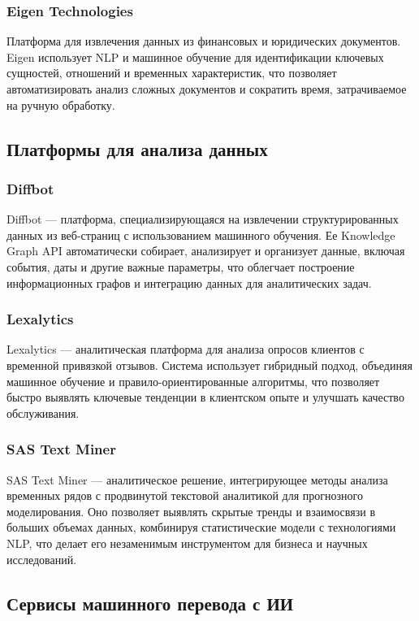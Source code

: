 \subsubsection{Eigen Technologies}
Платформа для извлечения данных из финансовых и юридических документов. Eigen использует NLP и машинное обучение для идентификации ключевых сущностей, отношений и временных характеристик, что позволяет автоматизировать анализ сложных документов и сократить время, затрачиваемое на ручную обработку.

\subsection{Платформы для анализа данных}

\subsubsection{Diffbot}
Diffbot — платформа, специализирующаяся на извлечении структурированных данных из веб-страниц с использованием машинного обучения. Ее Knowledge Graph API автоматически собирает, анализирует и организует данные, включая события, даты и другие важные параметры, что облегчает построение информационных графов и интеграцию данных для аналитических задач.

\subsubsection{Lexalytics}
Lexalytics — аналитическая платформа для анализа опросов клиентов с временной привязкой отзывов. Система использует гибридный подход, объединяя машинное обучение и правило-ориентированные алгоритмы, что позволяет быстро выявлять ключевые тенденции в клиентском опыте и улучшать качество обслуживания.

\subsubsection{SAS Text Miner}
SAS Text Miner — аналитическое решение, интегрирующее методы анализа временных рядов с продвинутой текстовой аналитикой для прогнозного моделирования. Оно позволяет выявлять скрытые тренды и взаимосвязи в больших объемах данных, комбинируя статистические модели с технологиями NLP, что делает его незаменимым инструментом для бизнеса и научных исследований.

\subsection{Сервисы машинного перевода с ИИ}

